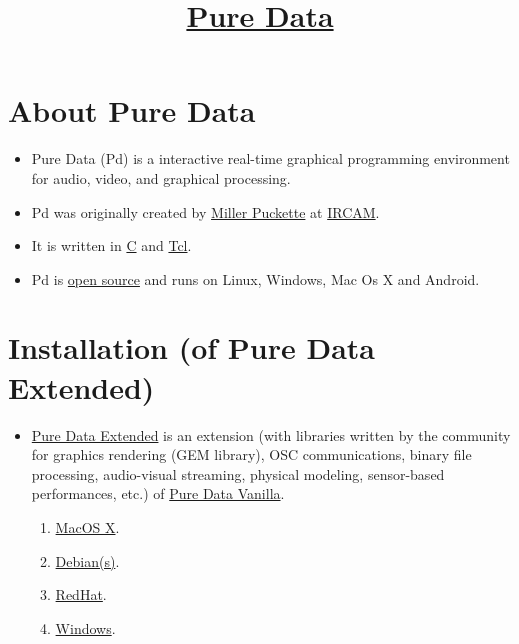 \title{\href{http://puredata.info/}{Pure Data}}

\maketitle
\tableofcontents


\section{About Pure Data}

\begin{itemize}
\item Pure Data (Pd) is a interactive real-time graphical programming
  environment for audio, video, and graphical processing.
\item Pd was originally created by \href{http://msp.ucsd.edu/}{Miller
    Puckette} at \href{http://www.ircam.fr/}{IRCAM}.
\item It is written in
  \href{http://en.wikipedia.org/wiki/C_\%28programming_language\%29}{C}
  and \href{http://en.wikipedia.org/wiki/Tcl}{Tcl}.
\item Pd is \href{http://puredata.info/about/pdlicense}{open source}
  and runs on Linux, Windows, Mac Os X and Android.
\end{itemize}


\section{Installation (of Pure Data Extended)}

\begin{itemize}
\item \href{http://puredata.info/downloads/pd-extended}{Pure Data
    Extended} is an extension (with libraries written by the community
  for graphics rendering (GEM library), OSC communications, binary
  file processing, audio-visual streaming, physical modeling,
  sensor-based performances, etc.) of
  \href{http://puredata.info/downloads/pure-data}{Pure Data Vanilla}.
  \begin{enumerate}
  \item \href{http://puredata.info/docs/faq/macosx}{MacOS X}.
  \item \href{http://puredata.info/docs/faq/debian}{Debian(s)}.
  \item \href{http://puredata.info/docs/faq/redhat}{RedHat}.
  \item \href{http://puredata.info/docs/faq/w32}{Windows}.
  \end{enumerate}
\end{itemize}

